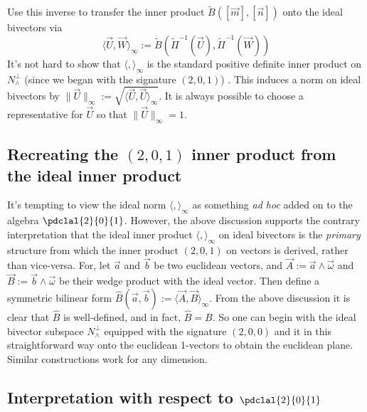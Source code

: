\documentclass[12pt]{article}
\begin{document}
Use this inverse to transfer the inner product $\widetilde{B}( [\vec{m}], [\vec{n}])$ onto the ideal bivectors via \[ \langle \vec{U},\vec{W} \rangle_{\infty}  := \widetilde{B}(\widetilde{ \Pi}^{-1}(\vec{U}), \widetilde{\Pi}^{-1}(\vec{W}) )\]   It's not hard to show that $\langle , \rangle_{\infty}$ is the standard positive definite inner product  on $N^{\perp}_{\wedge}$ (since we began with the signature $(2,0,1)$) .  This induces a norm on ideal bivectors by $\| \vec{U} \|_{\infty} := \sqrt{\langle \vec{U}, \vec{U} \rangle_{\infty}}$.  It is always possible to choose a representative for $\vec{U}$ so that $\| \vec{U} \|_{\infty} = 1$. 

\subsection{Recreating the $(2,0,1)$ inner product from the ideal inner product}
\label{sec:eipfromiip}
 It's tempting to view the ideal norm $\langle, \rangle_{\infty}$ as something \emph{ad hoc} added on to the algebra $\pdclal{2}{0}{1}$. However,  the above discussion supports the contrary interpretation that the ideal inner product $\langle, \rangle_{\infty}$ on ideal bivectors is the \emph{primary} structure from which the inner product $(2,0,1)$ on vectors is derived, rather than vice-versa.  For, let $\vec{a}$ and $\vec{b}$ be two euclidean vectors, and $\vec{A} := \vec{a} \wedge \vec{\omega}$ and $\vec{B} := \vec{b} \wedge \vec{\omega}$ be their wedge product with the ideal vector.  Then define a symmetric bilinear form $\widehat{B} (\vec{a}, \vec{b}) := \langle \vec{A}, \vec{B} \rangle_{\infty}$.  From the above discussion it is clear that $\widehat{B}$ is  well-defined, and in fact, $\widehat{B} = B$.  So one can begin with the ideal bivector subspace $N^{\perp}_{\wedge}$ equipped with the signature $(2,0,0)$ and  it in this straightforward way onto the euclidean 1-vectors to obtain the euclidean plane.  Similar constructions work for any dimension.

\subsection{Interpretation with respect to $\pdclal{2}{0}{1}$}
\end{document}
